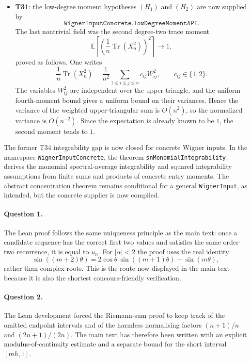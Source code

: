 \documentclass[11pt,a4paper]{article}
\begin{document}
\begin{itemize}[leftmargin=2em]
  \item \textbf{T31}: the low-degree moment hypotheses $(H_1)$ and $(H_2)$ are
  now supplied by
  \[
    \texttt{WignerInputConcrete.lowDegreeMomentAPI}.
  \]
  The last
  nontrivial field was the second degree-two trace moment
  \[
    \mathbb E\!\left[\left(\frac1n\operatorname{Tr}(X_n^2)\right)^2\right]
    \longrightarrow 1,
  \]
  proved as follows.  One writes
  \[
    \frac1n\operatorname{Tr}(X_n^2)
    =
    \frac1{n^2}\sum_{1\le i\le j\le n} c_{ij} W_{ij}^2,
    \qquad c_{ij}\in\{1,2\}.
  \]
  The variables \(W_{ij}^2\) are independent over the upper triangle, and the
  uniform fourth-moment bound gives a uniform bound on their variances.  Hence
  the variance of the weighted upper-triangular sum is \(O(n^2)\), so the
  normalized variance is \(O(n^{-2})\).  Since the expectation is already known
  to be \(1\), the second moment tends to \(1\).
\end{itemize}

The former T34 integrability gap is now closed for concrete Wigner inputs.  In
the namespace \texttt{WignerInputConcrete}, the theorem
\texttt{snMonomialIntegrability} derives the monomial spectral-average
integrability and squared integrability assumptions from finite sums and
products of concrete entry moments.  The abstract concentration theorem remains
conditional for a general \texttt{WignerInput}, as intended, but the concrete
supplier is now compiled.

\paragraph{Question 1.}
The Lean proof follows the same uniqueness principle as the main text: once a
candidate sequence has the correct first two values and satisfies the same
order-two recurrence, it is equal to $u_n$.  For $|\alpha|<2$ the proof uses
the real identity
\[
  \sin((m+2)\theta)
  =
  2\cos\theta\,\sin((m+1)\theta)-\sin(m\theta),
\]
rather than complex roots.  This is the route now displayed in the main text
because it is also the shortest concours-friendly verification.

\paragraph{Question 2.}
The Lean development forced the Riemann-sum proof to keep track of the omitted
endpoint intervals and of the harmless normalising factors
$(n+1)/n$ and $(2n+1)/(2n)$.  The main text has therefore been written with an
explicit modulus-of-continuity estimate and a separate bound for the short
interval $[mh,1]$.
\end{document}
